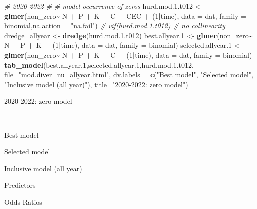 \documentclass[
]{article}
\newenvironment{Shaded}{\begin{snugshade}}{\end{snugshade}}
\newcommand{\AttributeTok}[1]{\textcolor[rgb]{0.13,0.29,0.53}{#1}}
\newcommand{\CommentTok}[1]{\textcolor[rgb]{0.56,0.35,0.01}{\textit{#1}}}
\newcommand{\DecValTok}[1]{\textcolor[rgb]{0.00,0.00,0.81}{#1}}
\newcommand{\FloatTok}[1]{\textcolor[rgb]{0.00,0.00,0.81}{#1}}
\newcommand{\FunctionTok}[1]{\textcolor[rgb]{0.13,0.29,0.53}{\textbf{#1}}}
\newcommand{\NormalTok}[1]{#1}
\newcommand{\OtherTok}[1]{\textcolor[rgb]{0.56,0.35,0.01}{#1}}
\newcommand{\SpecialCharTok}[1]{\textcolor[rgb]{0.81,0.36,0.00}{\textbf{#1}}}
\newcommand{\StringTok}[1]{\textcolor[rgb]{0.31,0.60,0.02}{#1}}
\begin{document}
\begin{Shaded}
\begin{Highlighting}[]
\CommentTok{\# 2020{-}2022 \#}
\CommentTok{\# model occurrence of zeros}
\NormalTok{hurd.mod.}\FloatTok{1.}\NormalTok{t012 }\OtherTok{\textless{}{-}} \FunctionTok{glmer}\NormalTok{(non\_zero}\SpecialCharTok{\textasciitilde{}}\NormalTok{ N }\SpecialCharTok{+}\NormalTok{ P }\SpecialCharTok{+}\NormalTok{ K }\SpecialCharTok{+}\NormalTok{ C }\SpecialCharTok{+}\NormalTok{ CEC }\SpecialCharTok{+}\NormalTok{ (}\DecValTok{1}\SpecialCharTok{|}\NormalTok{time), }\AttributeTok{data =}\NormalTok{ dat, }\AttributeTok{family =}\NormalTok{ binomial,}\AttributeTok{na.action =} \StringTok{"na.fail"}\NormalTok{)}
\CommentTok{\# vif(hurd.mod.1.t012) \# no collinearity}
\NormalTok{dredge\_allyear }\OtherTok{\textless{}{-}} \FunctionTok{dredge}\NormalTok{(hurd.mod.}\FloatTok{1.}\NormalTok{t012)}
\NormalTok{best.allyear}\FloatTok{.1} \OtherTok{\textless{}{-}} \FunctionTok{glmer}\NormalTok{(non\_zero}\SpecialCharTok{\textasciitilde{}}\NormalTok{ N }\SpecialCharTok{+}\NormalTok{ P }\SpecialCharTok{+}\NormalTok{ K }\SpecialCharTok{+}\NormalTok{ (}\DecValTok{1}\SpecialCharTok{|}\NormalTok{time), }\AttributeTok{data =}\NormalTok{ dat, }\AttributeTok{family =}\NormalTok{ binomial)}
\NormalTok{selected.allyear}\FloatTok{.1} \OtherTok{\textless{}{-}} \FunctionTok{glmer}\NormalTok{(non\_zero}\SpecialCharTok{\textasciitilde{}}\NormalTok{ N }\SpecialCharTok{+}\NormalTok{ P }\SpecialCharTok{+}\NormalTok{ K }\SpecialCharTok{+}\NormalTok{ C }\SpecialCharTok{+}\NormalTok{ (}\DecValTok{1}\SpecialCharTok{|}\NormalTok{time), }\AttributeTok{data =}\NormalTok{ dat, }\AttributeTok{family =}\NormalTok{ binomial)}
\FunctionTok{tab\_model}\NormalTok{(best.allyear}\FloatTok{.1}\NormalTok{,selected.allyear}\FloatTok{.1}\NormalTok{,hurd.mod.}\FloatTok{1.}\NormalTok{t012, }\AttributeTok{file=}\StringTok{"mod.diver\_nu\_allyear.html"}\NormalTok{, }\AttributeTok{dv.labels =} \FunctionTok{c}\NormalTok{(}\StringTok{"Best model"}\NormalTok{, }\StringTok{"Selected model"}\NormalTok{, }\StringTok{"Inclusive model (all year)"}\NormalTok{), }\AttributeTok{title=}\StringTok{"2020{-}2022: zero model"}\NormalTok{)}
\end{Highlighting}
\end{Shaded}

2020-2022: zero model

~

Best model

Selected model

Inclusive model (all year)

Predictors

Odds Ratios
\end{document}
